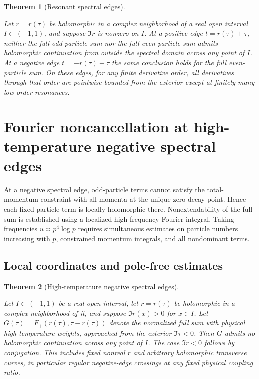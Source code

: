 \documentclass[11pt,a4paper]{article}
\numberwithin{equation}{section}
\theoremstyle{plain}
\newtheorem{theorem}{Theorem}[section]
\theoremstyle{definition}
\begin{document}
\begin{theorem}[Resonant spectral edges]\label{thm:edges}

Let \(r=r(\tau)\) be holomorphic in a complex neighborhood of a real open interval \(I\subset(-1,1)\), and suppose \(\Im r\) is nonzero on \(I\). At a positive edge \(t=r(\tau)+\tau\), neither the full odd-particle sum nor the full even-particle sum admits holomorphic continuation from outside the spectral domain across any point of \(I\). At a negative edge \(t=-r(\tau)+\tau\) the same conclusion holds for the full even-particle sum. On these edges, for any finite derivative order, all derivatives through that order are pointwise bounded from the exterior except at finitely many low-order resonances.

\end{theorem}

\section{Fourier noncancellation at high-temperature negative spectral edges}\label{sec:negedge}

At a negative spectral edge, odd-particle terms cannot satisfy the total-momentum constraint with all momenta at the unique zero-decay point. Hence each fixed-particle term is locally holomorphic there. Nonextendability of the full sum is established using a localized high-frequency Fourier integral. Taking frequencies \(u\asymp p^4\log p\) requires simultaneous estimates on particle numbers increasing with \(p\), constrained momentum integrals, and all nondominant terms.

\subsection{Local coordinates and pole-free estimates}\label{sec:neg-local}

\begin{theorem}[High-temperature negative spectral edges]\label{thm:negative}

Let \(I\subset(-1,1)\) be a real open interval, let \(r=r(\tau)\) be holomorphic in a complex neighborhood of it, and suppose \(\Im r(x)>0\) for \(x\in I\). Let \(G(\tau)=F_+(r(\tau),\tau-r(\tau))\) denote the normalized full sum with physical high-temperature weights, approached from the exterior \(\Im\tau<0\). Then \(G\) admits no holomorphic continuation across any point of \(I\). The case \(\Im r<0\) follows by conjugation. This includes fixed nonreal \(r\) and arbitrary holomorphic transverse curves, in particular regular negative-edge crossings at any fixed physical coupling ratio.

\end{theorem}
\end{document}
